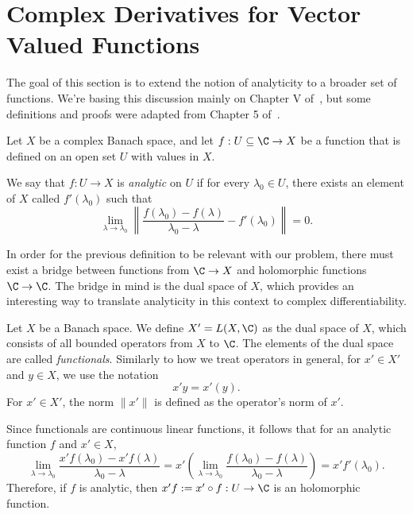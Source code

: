 
\section{Complex Derivatives for Vector Valued Functions}

The goal of this section is to extend the notion of analyticity to a broader set of functions. We're basing this discussion mainly on Chapter V of~\cite{taylor1986introduction}, but some definitions and proofs were adapted from Chapter 5 of~\cite{winklmeier2013functional}.

Let $X$ be a complex Banach space, and let $f: U\subseteq \C \to X$ be a function that is defined on an open set $U$ with values in $X$.

\begin{definition}\label{def:analytic}
    We say that $f: U \to X$ is \textit{analytic} on $U$ if for every $\lambda_0 \in U$, there exists an element of $X$ called $f'(\lambda_0)$ such that
    \[ \lim_{\lambda \to \lambda_0} \left\| \frac{f(\lambda_0)-f(\lambda)}{\lambda_0 - \lambda} - f'(\lambda_0) \right\| = 0. \]
\end{definition}

In order for the previous definition to be relevant with our problem, there must exist a bridge between functions from $\C \to X$ and holomorphic functions $\C \to \C$. The bridge in mind is the dual space of $X$, which provides an interesting way to translate analyticity in this context to complex differentiability.

\begin{definition}\label{def:dual_space}\label{def:functional}
    Let $X$ be a Banach space. We define $X' = L(X,\C)$ as the dual space of $X$, which consists of all bounded operators from $X$ to $\C$. The elements of the dual space are called \textit{functionals}. Similarly to how we treat operators in general, for $x'\in X'$ and $y \in X$, we use the notation
    \[ x'y = x'(y) .\]
    For $x' \in X'$, the norm $\|x'\|$ is defined as the operator's norm of $x'$.
\end{definition}

\begin{remark} Since functionals are continuous linear functions, it follows that for an analytic function $f$ and $x' \in X$,
    \[ \lim_{\lambda \to \lambda_0} \frac{x'f(\lambda_0)-x'f(\lambda)}{\lambda_0 - \lambda} = x'\left( \lim_{\lambda \to \lambda_0} \frac{f(\lambda_0)-f(\lambda)}{\lambda_0-\lambda}  \right) = x'f'(\lambda_0). \]
Therefore, if $f$ is analytic, then $x'f := x'\circ f: U \to \C$ is an holomorphic function. 
\end{remark}


